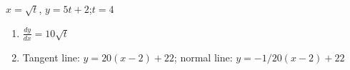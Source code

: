 {$x=\sqrt{t}$, $y=5t+2$;\quad $t=4$}
{\begin{enumerate}
	\item $\frac{dy}{dx} = 10\sqrt{t}$
	\item	Tangent line: $y= 20(x-2)+22$; normal line: $y = -1/20(x-2)+22$
\end{enumerate}
}
